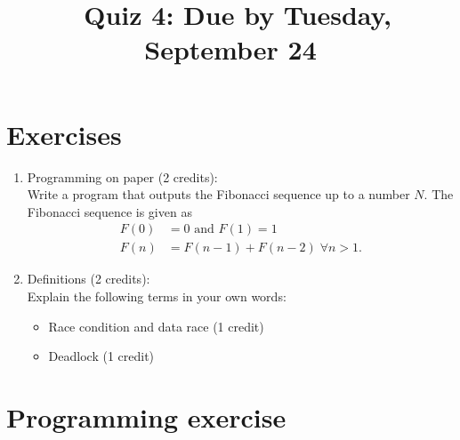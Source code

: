 \documentclass[11pt]{article}
\begin{document}
\title{\coursename~Quiz 4: Due by Tuesday, September 24}
\date{}
\maketitle

\medskip


\section*{Exercises}

\begin{enumerate}
\item Programming on paper (2 credits): \\
Write a program that outputs the Fibonacci sequence up to a number $N$. The Fibonacci sequence is given as
\begin{align*}
F(0) &= 0 \text{ and } F(1) = 1  \\
F(n) &= F(n-1) + F(n-2) \; \forall n > 1\text{.}
\end{align*} 

\item Definitions (2 credits): \\
Explain the following terms in your own words:
\begin{itemize}
\item Race condition and data race (1 credit)
\item Deadlock (1 credit)
\end{itemize}


\end{enumerate}

\section*{Programming exercise}
\end{document}
